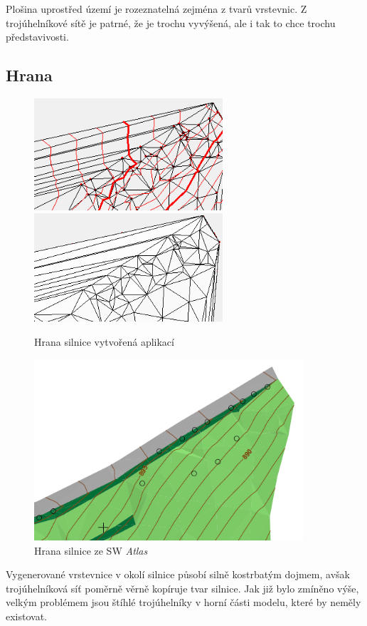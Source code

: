 \documentclass[a4paper, 12pt]{article}
\begin{document}
Plošina uprostřed území je rozeznatelná zejména z tvarů vrstevnic. Z trojúhelníkové sítě je patrné, že je trochu vyvýšená, ale i tak to chce trochu představivosti.

\subsection{Hrana}
\begin{figure}[h!]
	\centering
	\includegraphics[width=7cm]{./pictures/kupec_edge_contours.png}
	\includegraphics[width=7cm]{./pictures/kupec_edge_slope.png}
	\caption{Hrana silnice vytvořená aplikací}
\end{figure}

\begin{figure}[h!]
	\centering
	\includegraphics[width=10cm]{./pictures/atlas_edge.png}
	\caption{Hrana silnice ze SW \textit{Atlas}}
\end{figure}

Vygenerované vrstevnice v okolí silnice působí silně kostrbatým dojmem, avšak trojúhelníková síť poměrně věrně kopíruje tvar silnice. Jak již bylo zmíněno výše, velkým problémem jsou štíhlé trojúhelníky v horní části modelu, které by neměly existovat.
\end{document}
